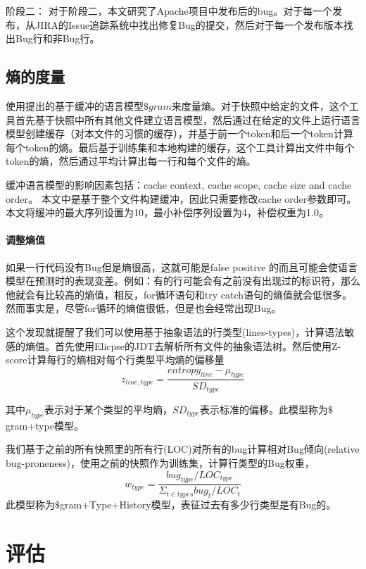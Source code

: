 \documentclass[a4paper]{article}
\begin{document}
阶段二：
对于阶段二，本文研究了Apache项目中发布后的bug。对于每一个发布，从JIRA的Issue追踪系统中找出修复Bug的提交，然后对于每一个发布版本找出Bug行和非Bug行。

\subsection{熵的度量}

使用\cite{tu2014localness}提出的基于缓冲的语言模型$\$gram$来度量熵。对于快照中给定的文件，这个工具首先基于快照中所有其他文件建立语言模型，然后通过在给定的文件上运行语言模型创建缓存（对本文件的习惯的缓存），并基于前一个token和后一个token计算每个token的熵。最后基于训练集和本地构建的缓存，这个工具计算出文件中每个token的熵，然后通过平均计算出每一行和每个文件的熵。

缓冲语言模型的影响因素包括：cache context, cache scope, cache size and cache order。 本文中是基于整个文件构建缓冲，因此只需要修改cache order参数即可。本文将缓冲的最大序列设置为10，最小补偿序列设置为4，补偿权重为1.0。

\paragraph{调整熵值} 如果一行代码没有Bug但是熵很高，这就可能是false positive 的而且可能会使语言模型在预测时的表现变差。例如：有的行可能会有之前没有出现过的标识符，那么他就会有比较高的熵值，相反，for循环语句和try catch语句的熵值就会低很多。然而事实是，尽管for循环的熵值很低，但是也会经常出现Bug。

这个发现就提醒了我们可以使用基于抽象语法的行类型(lines-types)，计算语法敏感的熵值。首先使用Elicpse的JDT去解析所有文件的抽象语法树。然后使用Z-score计算每行的熵相对每个行类型平均熵的偏移量$$z_{line,type} = \frac{entropy_{line} - \mu_{type}}{SD_{type}}$$

其中$\mu_{type}$表示对于某个类型的平均熵，$SD_{type}$表示标准的偏移。此模型称为$\$$gram+type模型。


我们基于之前的所有快照里的所有行(LOC)对所有的bug计算相对Bug倾向(relative bug-proneness)，使用之前的快照作为训练集，计算行类型的Bug权重，$$w_{type} = \frac{bug_{type}/LOC_{type}}{\Sigma_{t\in{types}}bug_t/LOC_t}$$
此模型称为$\$$gram+Type+History模型，表征过去有多少行类型是有Bug的。

\section{评估}
\end{document}
